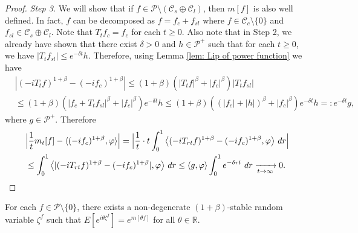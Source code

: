 \documentclass[EJP]{ejpecp} %
\begin{document}
\begin{proof}
  \emph{Step 3.} We will show that if $f\in \mathcal P \setminus (\mathcal C_s \oplus \mathcal C_l)$, then $m[f]$ is also well defined.
  In fact, $f$ can be decomposed as $f = f_c + f_{sl}$ where $f \in \mathcal C_c\setminus \{0\}$ and $f_{sl}\in \mathcal C_s \oplus \mathcal C_l$.
  Note that $T_t f_c = f_c$ for each $t\geq 0$.
  Also note that in Step 2, we already have shown that there exist $\delta > 0$ and $h \in \mathcal P^+$ such that for each $t\geq 0$, we have $|T_t f_{sl}| \leq e^{- \delta t}h$.
  Therefore, using Lemma \ref{lem: Lip of power function} we have
  \begin{align}
    &|(-iT_t f)^{1+\beta} - (-i f_c)^{1+\beta}|
      \leq (1+\beta) ( |T_tf|^\beta + |f_c|^\beta) |T_tf_{sl}|
    \\&\leq (1+\beta) ( |f_c + T_t f_{sl}|^\beta + |f_c|^\beta) e^{- \delta t} h
    \leq (1+\beta) ( (|f_c| + |h|)^\beta + |f_c|^\beta) e^{- \delta t} h
    =: e^{- \delta t} g,
  \end{align}
  where $g\in \mathcal P^+$.
  Therefore
  \begin{align}
    \label{eq:P:S:1}
    &\Big| \frac{1}{t} m_t[f] - \langle (-if_c)^{1+\beta}, \varphi\rangle\Big|
      = \Big| \frac{1}{t} \cdot t \int_0^1  \big\langle (-iT_{rt}f)^{1+\beta} - (-if_c)^{1+\beta}, \varphi\big \rangle ~dr \Big|\\
    &\leq \int_0^1  \big\langle |(-iT_{rt}f)^{1+\beta} - (-if_c)^{1+\beta}|, \varphi\big \rangle ~dr 
      \leq \langle g,\varphi\rangle\int_0^1 e^{-\delta rt} ~dr
      \xrightarrow[t\to \infty]{} 0.
      \qedhere
  \end{align}
\end{proof}

\begin{proposition}
  \label{prop:PL:S}
  For each $f \in \mathcal P\setminus \{0\}$, there exists a non-degenerate $(1+\beta)$-stable random variable $\zeta^f$ such that $ E[e^{i\theta\zeta^f}] = e^{m[\theta f]}$ for all $\theta \in \mathbb R$.
\end{proposition}
\end{document}
